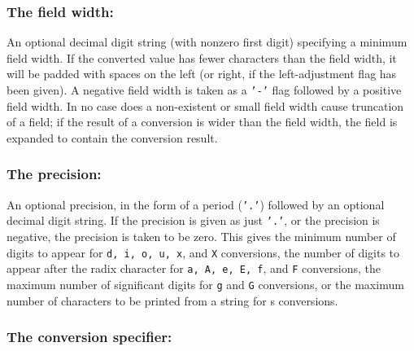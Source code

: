 \subsubsection{The field width:}

An  optional decimal digit string (with nonzero first digit) specifying a minimum field width.  If the converted  value  has  fewer  characters than  the  field  width,  it will be padded with spaces on the left (or right, if the left-adjustment flag has been given).  A  negative  field width is taken as a \texttt{'-'} flag followed by a positive field  width. In no case does a non-existent or small field width cause truncation of a field; if the result of a conversion is wider than the  field  width, the field is expanded to contain the conversion result.

\subsubsection{The precision:}

An  optional  precision,  in the form of a period (\texttt{'.'})  followed by an optional decimal digit string.  If the precision is given as just \texttt{'.'}, or the precision is negative, the precision is  taken  to  be zero.   This  gives the minimum number of digits to appear for \texttt{d, i, o, u, x}, and \texttt{X} conversions, the number of digits to appear after the radix character  for  \texttt{a, A, e, E, f}, and \texttt{F} conversions, the maximum number of significant digits for \texttt{g} and \texttt{G} conversions, or the  maximum  number  of  characters to be printed from a string for s conversions.

\subsubsection{The conversion specifier:}

